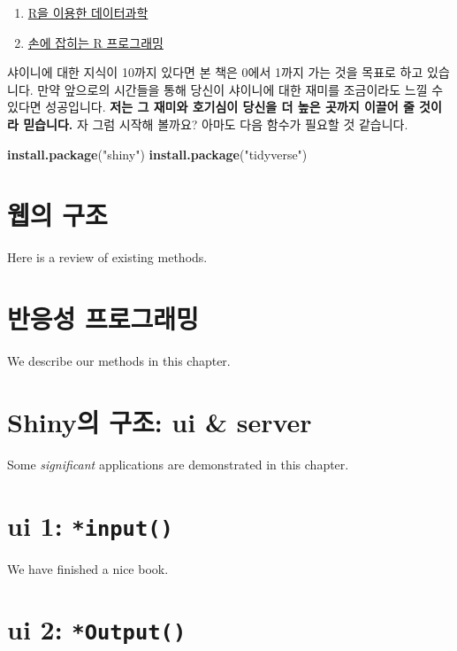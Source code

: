 \documentclass[]{book}
\newenvironment{Shaded}{\begin{snugshade}}{\end{snugshade}}
\newcommand{\KeywordTok}[1]{\textcolor[rgb]{0.13,0.29,0.53}{\textbf{#1}}}
\newcommand{\StringTok}[1]{\textcolor[rgb]{0.31,0.60,0.02}{#1}}
\newcommand{\NormalTok}[1]{#1}
\providecommand{\tightlist}{%
  \setlength{\itemsep}{0pt}\setlength{\parskip}{0pt}}
\begin{document}
\begin{enumerate}
\def\labelenumi{\arabic{enumi}.}
\tightlist
\item
  \href{https://r4ds.had.co.nz/}{R을 이용한 데이터과학}
\item
  \href{https://rstudio-education.github.io/hopr/}{손에 잡히는 R
  프로그래밍}
\end{enumerate}

샤이니에 대한 지식이 10까지 있다면 본 책은 0에서 1까지 가는 것을 목표로
하고 있습니다. 만약 앞으로의 시간들을 통해 당신이 샤이니에 대한 재미를
조금이라도 느낄 수 있다면 성공입니다. \textbf{저는 그 재미와 호기심이
당신을 더 높은 곳까지 이끌어 줄 것이라 믿습니다.} 자 그럼 시작해 볼까요?
아마도 다음 함수가 필요할 것 같습니다.

\begin{Shaded}
\begin{Highlighting}[]
\KeywordTok{install.package}\NormalTok{(}\StringTok{"shiny"}\NormalTok{)}
\KeywordTok{install.package}\NormalTok{(}\StringTok{"tidyverse"}\NormalTok{)}
\end{Highlighting}
\end{Shaded}

\chapter{웹의 구조}\label{web}

Here is a review of existing methods.

\chapter{반응성 프로그래밍}\label{reactive}

We describe our methods in this chapter.

\chapter{Shiny의 구조: ui \& server}\label{structure}

Some \emph{significant} applications are demonstrated in this chapter.

\chapter{\texorpdfstring{ui 1:
\texttt{*input()}}{ui 1: *input()}}\label{ui1}

We have finished a nice book.

\chapter{\texorpdfstring{ui 2:
\texttt{*Output()}}{ui 2: *Output()}}\label{ui2}
\end{document}
